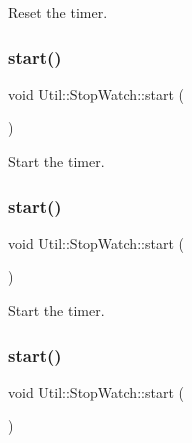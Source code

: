 Reset the timer. 

\mbox{\label{classUtil_1_1StopWatch_a87db8057d5ddf177cfcc9ae497337d13}} 
\subsubsection{\texorpdfstring{start()}{start()}\hspace{0.1cm}{\footnotesize\ttfamily [1/3]}}
{\footnotesize\ttfamily void Util\+::\+Stop\+Watch\+::start (\begin{DoxyParamCaption}{ }\end{DoxyParamCaption})}



Start the timer. 

\mbox{\label{classUtil_1_1StopWatch_a87db8057d5ddf177cfcc9ae497337d13}} 
\subsubsection{\texorpdfstring{start()}{start()}\hspace{0.1cm}{\footnotesize\ttfamily [2/3]}}
{\footnotesize\ttfamily void Util\+::\+Stop\+Watch\+::start (\begin{DoxyParamCaption}{ }\end{DoxyParamCaption})}



Start the timer. 

\mbox{\label{classUtil_1_1StopWatch_a87db8057d5ddf177cfcc9ae497337d13}} 
\subsubsection{\texorpdfstring{start()}{start()}\hspace{0.1cm}{\footnotesize\ttfamily [3/3]}}
{\footnotesize\ttfamily void Util\+::\+Stop\+Watch\+::start (\begin{DoxyParamCaption}{ }\end{DoxyParamCaption})}



